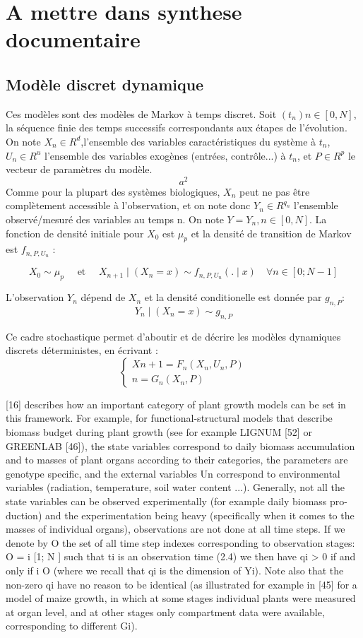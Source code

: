 \section{A mettre dans synthese documentaire}
\subsection{Modèle discret dynamique}

Ces modèles sont des modèles de Markov à temps discret. Soit $(t_{n}) n \in [0,N]$, la séquence finie des temps successifs correspondants aux étapes de l’évolution. On note $X_{n}\in R^d$,l'ensemble des variables caractéristiques du système à $t_{n}$, $U_n \in R^u$  l'ensemble des variables exogènes (entrées, contrôle...) à $t_{n}$, et $P\in R^p$ le vecteur de paramètres du modèle.
\[ a^2 \]
Comme pour la plupart des systèmes biologiques, $X_{n}$ peut ne pas être complètement accessible à l'observation, et on note donc $Y_n \in R^{q_n}$ l'ensemble observé/mesuré des variables au temps n. On note $Y=Y_n, n \in [0,N]$. La fonction de densité initiale pour $X_0$ est $\mu_p$ et la densité de transition de Markov est $f_{n,P,U_n}$ :

\[
	X_0 \sim \mu_p \quad \text{ et } \quad
	 X_{n+1} \mid (X_n=x) \sim f_{n,P,U_n}(.\mid x)				\quad \forall n \in [0;N-1]
\]

L'observation $Y_n$ dépend de $X_n$ et la densité conditionelle est donnée par $g_{n,P}$:
\[Y_n \mid (X_n = x) \sim g_{n,P}\]

Ce cadre stochastique permet d'aboutir et de décrire les modèles dynamiques discrets déterministes, en écrivant : 
\[
\left\{
    \begin{array}{ll}
        Xn+1 = F_n(X_n,U_n,P) 	 \\
        n =G_n(X_n,P)
    \end{array}
\right.
\]

[16] describes how an important category of plant growth models can be set in this framework. For example, for functional-structural models that describe biomass budget during plant growth (see for example LIGNUM [52] or GREENLAB [46]), the state variables correspond to daily biomass accumulation and to masses of plant organs according to their categories, the parameters are genotype specific, and the external variables Un correspond to environmental variables (radiation, temperature, soil water content ...).
Generally, not all the state variables can be observed experimentally (for example daily biomass pro- duction) and the experimentation being heavy (specifically when it comes to the masses of individual organs), observations are not done at all time steps. If we denote by O the set of all time step indexes corresponding to observation stages:
O = {i  [1; N ] such that ti is an observation time} (2.4)
we then have qi > 0 if and only if i  O (where we recall that qi is the dimension of Yi). Note also that the non-zero qi have no reason to be identical (as illustrated for example in [45] for a model of maize growth, in which at some stages individual plants were measured at organ level, and at other stages only compartment data were available, corresponding to different Gi).